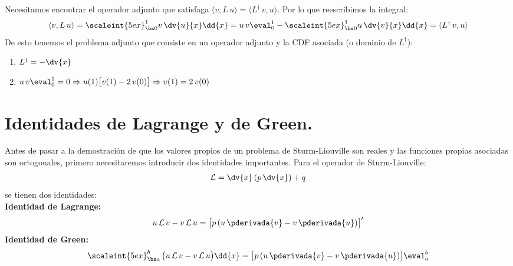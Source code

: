 Necesitamos encontrar el operador adjunto que satisfaga \hfill \break $\langle v, L \, u \rangle = \langle L^{\dagger} \, v, u \rangle$. Por lo que reescribimos la integral:
\begin{align*}
\langle v, L \, u \rangle = \scaleint{5ex}_{\bs 0}^{1} v \, \dv{u}{x} \dd{x} = u \, v \eval_{0}^{1} - \scaleint{5ex}_{\bs 0}^{1} u \, \dv{v}{x} \dd{x} = \langle L^{\dagger} \, v, u \rangle
\end{align*}
De esto tenemos el problema adjunto que consiste en un operador adjunto y la CDF asociada (o dominio de $L^{\dagger}$):
\begin{enumerate}
\item $L^{\dagger} = - \dv{x}$
\item $\displaystyle u \, v \eval_{0}^{1} = 0 \Rightarrow u(1) \big[ v(1) - 2 \, v(0) \big] \Rightarrow v(1) = 2 \, v(0)$
\end{enumerate}
\vspace{0.3cm}
\noindent

\section{Identidades de Lagrange y de Green.}

Antes de pasar a la demostración de que los valores propios de un problema de Sturm-Liouville son reales y las funciones propias asociadas son ortogonales, primero necesitaremos introducir dos identidades importantes. Para el operador de Sturm-Liouville:
\begin{align*}
\mathcal{L} = \dv{x} \left( p \, \dv{x} \right) + q
\end{align*}
se tienen dos identidades:
\\
\noindent
\textbf{Identidad de Lagrange:} 
\begin{align*}
u \, \mathcal{L} \, v - v \, \mathcal{L} \, u = \big[ p \, (u \, \pderivada{v} - v \, \pderivada{u}) \big]^{\prime}
\end{align*}
\noindent
\textbf{Identidad de Green:} 
\begin{align*}
\scaleint{5ex}_{\bs a}^{b} \, \big(u \, \mathcal{L} \, v - v \, \mathcal{L} \, u \big) \dd{x} = \big[ p \, (u \, \pderivada{v} - v \, \pderivada{u}) \big]\eval_{a}^{b}
\end{align*}

